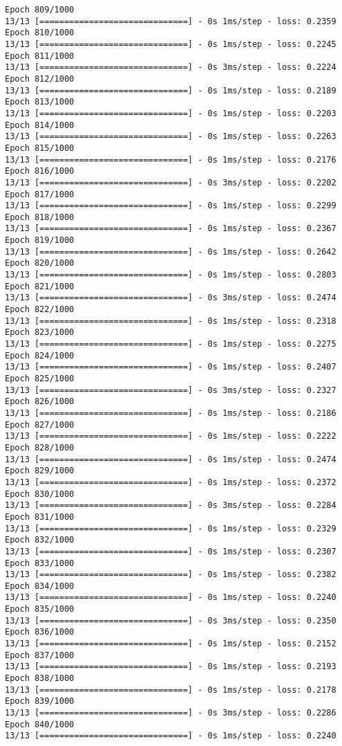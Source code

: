\documentclass[11pt]{article}
\begin{document}
\begin{Verbatim}[commandchars=\\\{\}]
Epoch 809/1000
13/13 [==============================] - 0s 1ms/step - loss: 0.2359
Epoch 810/1000
13/13 [==============================] - 0s 1ms/step - loss: 0.2245
Epoch 811/1000
13/13 [==============================] - 0s 3ms/step - loss: 0.2224
Epoch 812/1000
13/13 [==============================] - 0s 1ms/step - loss: 0.2189
Epoch 813/1000
13/13 [==============================] - 0s 1ms/step - loss: 0.2203
Epoch 814/1000
13/13 [==============================] - 0s 1ms/step - loss: 0.2263
Epoch 815/1000
13/13 [==============================] - 0s 1ms/step - loss: 0.2176
Epoch 816/1000
13/13 [==============================] - 0s 3ms/step - loss: 0.2202
Epoch 817/1000
13/13 [==============================] - 0s 1ms/step - loss: 0.2299
Epoch 818/1000
13/13 [==============================] - 0s 1ms/step - loss: 0.2367
Epoch 819/1000
13/13 [==============================] - 0s 1ms/step - loss: 0.2642
Epoch 820/1000
13/13 [==============================] - 0s 1ms/step - loss: 0.2803
Epoch 821/1000
13/13 [==============================] - 0s 3ms/step - loss: 0.2474
Epoch 822/1000
13/13 [==============================] - 0s 1ms/step - loss: 0.2318
Epoch 823/1000
13/13 [==============================] - 0s 1ms/step - loss: 0.2275
Epoch 824/1000
13/13 [==============================] - 0s 1ms/step - loss: 0.2407
Epoch 825/1000
13/13 [==============================] - 0s 3ms/step - loss: 0.2327
Epoch 826/1000
13/13 [==============================] - 0s 1ms/step - loss: 0.2186
Epoch 827/1000
13/13 [==============================] - 0s 1ms/step - loss: 0.2222
Epoch 828/1000
13/13 [==============================] - 0s 1ms/step - loss: 0.2474
Epoch 829/1000
13/13 [==============================] - 0s 1ms/step - loss: 0.2372
Epoch 830/1000
13/13 [==============================] - 0s 3ms/step - loss: 0.2284
Epoch 831/1000
13/13 [==============================] - 0s 1ms/step - loss: 0.2329
Epoch 832/1000
13/13 [==============================] - 0s 1ms/step - loss: 0.2307
Epoch 833/1000
13/13 [==============================] - 0s 1ms/step - loss: 0.2382
Epoch 834/1000
13/13 [==============================] - 0s 1ms/step - loss: 0.2240
Epoch 835/1000
13/13 [==============================] - 0s 3ms/step - loss: 0.2350
Epoch 836/1000
13/13 [==============================] - 0s 1ms/step - loss: 0.2152
Epoch 837/1000
13/13 [==============================] - 0s 1ms/step - loss: 0.2193
Epoch 838/1000
13/13 [==============================] - 0s 1ms/step - loss: 0.2178
Epoch 839/1000
13/13 [==============================] - 0s 3ms/step - loss: 0.2286
Epoch 840/1000
13/13 [==============================] - 0s 1ms/step - loss: 0.2240

\end{Verbatim}
\end{document}
